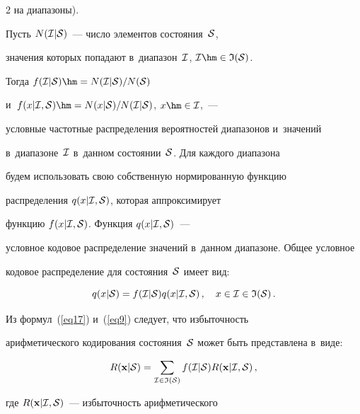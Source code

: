 \begin{multicols}{2}
на диапазоны).



Пусть $N({\cal I}|{\cal S})$~--- число элементов состояния~${\cal S}$, 

значения которых попадают в~диапазон~${\cal I}$, ${\cal I}\hm\in{\frak I}({\cal S})$. 

Тогда $f({\cal I}|{\cal S})\hm=N({\cal I}|{\cal S})/N({\cal S})$ 

и~$f(x|{\cal I},{\cal S})\hm=N({x|\cal S})/N({\cal I}|{\cal S})$,  $x\hm\in{\cal I}$,~--- 

условные частотные распределения вероятностей диапазонов и~значений 

в~диапазоне~${\cal I}$ в~данном состоянии~${\cal S}$. Для каждого диапазона 

будем использовать свою собственную нормированную функцию 

распределения $q(x|{\cal I},{\cal S})$, которая аппроксимирует 

функцию $f(x|{\cal I},{\cal S})$. Функция $q(x|{\cal I},{\cal S})$~--- 

условное кодовое распределение значений в~данном диапазоне. Общее условное 

кодовое распределение для со\-сто\-яния~${\cal S}$   имеет вид:

\begin{equation}

\label{eq17}

q(x|{\cal S}) = f({\cal I}|{\cal S}) q(x|{\cal I},{\cal S})\,, 

\quad x\in{\cal I}\in{\frak I({\cal S})}\,.

\end{equation}

Из формул~(\ref{eq17}) и~(\ref{eq9}) следует, что избыточность 

арифметического кодирования состояния~${\cal S}$ может быть представлена в~виде:

\begin{equation}

\label{eq18}

R(\mathbf{x}|{\cal S}) =

\sum\limits_{{\cal I}\in{\frak I}({\cal S})} f({\cal I}|{\cal S}) 

R(\mathbf{x}|{\cal I},{\cal S})\,,

\end{equation}

где $R(\mathbf{x}|{\cal I},{\cal S})$~--- избыточность арифметического 


\end{multicols}
